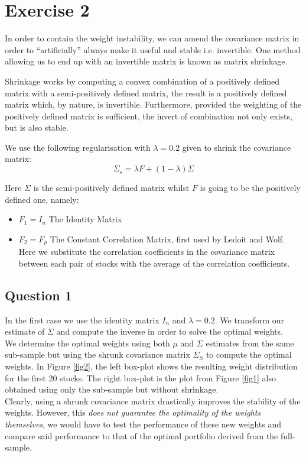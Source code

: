 \chapter*{Exercise 2}

In order to contain the weight instability, we can amend the covariance matrix in order to “artificially” always make it useful and stable i.e. invertible. One method allowing us to end up with an invertible matrix is known as matrix shrinkage. \par\smallskip
Shrinkage works by computing a convex combination of a positively defined matrix with a semi-positively defined matrix, the result is a positively defined matrix which, by nature, is invertible. Furthermore, provided the weighting of the positively defined matrix is sufficient, the invert of combination not only exists, but is also stable. \par\smallskip
We use the following regularisation with $\lambda=0.2$ given to shrink the covariance matrix:
\begin{equation*}
\Sigma_s = \lambda F + (1-\lambda)\Sigma
\end{equation*}

Here $\Sigma$ is the semi-positively defined matrix whilst $F$ is going to be the positively defined one, namely:

\begin{itemize}
    \item $F_1=I_n$ The Identity Matrix
    \item $F_2=F_{\overline{\rho}}$ The Constant Correlation Matrix, first used by Ledoit and Wolf. Here we substitute the correlation coefficients in the covariance matrix between each pair of stocks with the average of the correlation coefficients.
\end{itemize}

\section*{Question 1}

In the first case we use the identity matrix $I_n$ and $\lambda=0.2$. We transform our estimate of $\Sigma$ and compute the inverse in order to solve the optimal weights. \\
We determine the optimal weights using both $\mu$ and $\Sigma$ estimates from the same sub-sample but using the shrunk covariance matrix $\Sigma_S$ to compute the optimal weights. In Figure \ref{fig2}, the left box-plot shows the resulting weight distribution for the first 20 stocks. The right box-plot is the plot from Figure \ref{fig1} also obtained using only the sub-sample but without shrinkage. \\
Clearly, using a shrunk covariance matrix drastically improves the stability of the weights. However, this \emph{does not guarantee the optimality of the weights themselves}, we would have to test the performance of these new weights and compare said performance to that of the optimal portfolio derived from the full-sample.

